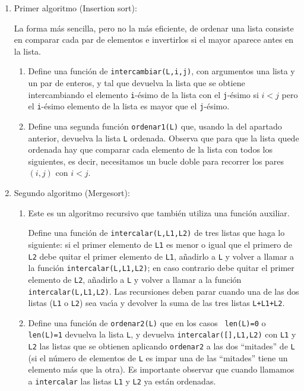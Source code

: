 \begin{enumerate}
\item {\sc Primer algoritmo (Insertion sort):}

\medskip

La forma m\'as sencilla, pero no la m\'as eficiente,  de ordenar una lista consiste en comparar cada par de elementos e invertirlos si el mayor aparece antes en la lista. 

\begin{ejer}
\begin{enumerate}
\item Define una funci\'on de {\sage} {\tt intercambiar(L,i,j)}, con argumentos
una
lista y un par de enteros, y tal que devuelva la lista que se obtiene
intercambiando el elemento {\tt i}-\'esimo de la lista con el
{\tt j}-\'esimo si $i<j$ pero el {\tt i}-\'esimo elemento de la lista es mayor que el
{\tt j}-\'esimo. %
\item Define una segunda funci\'on {\tt ordenar1(L)} que, usando
la del apartado anterior, devuelva la lista {\tt L} ordenada. Observa que para
que la lista quede ordenada hay que comparar cada elemento de la lista con {\sc
todos} los siguientes, es decir, necesitamos un bucle doble para recorrer los pares $(i,j)$ con $i<j$.
\end{enumerate}
\end{ejer}
\item \label{mergesort}{\sc Segundo algoritmo (Mergesort):}

\begin{ejer}
\begin{enumerate}
\item Este es un algoritmo recursivo que tambi\'en utiliza una funci\'on
auxiliar. 

Define una funci\'on de {\sage} {\tt intercalar(L,L1,L2)} de tres listas
que haga lo siguiente: si el primer elemento de {\tt L1} es menor o igual que el
primero de {\tt L2} debe quitar el primer elemento de {\tt L1}, a\~nadirlo a
{\tt L} y
volver a llamar a la funci\'on {\tt intercalar(L,L1,L2)};  en caso
contrario debe quitar el primer elemento de {\tt L2}, a\~nadirlo a {\tt L} y
volver a
llamar a la funci\'on {\tt intercalar(L,L1,L2)}. Las recursiones deben parar
cuando una de las dos listas ({\tt L1} o {\tt L2}) sea vac\'{\i}a y devolver la
suma
de las tres listas {\tt L+L1+L2}.
\item Define una funci\'on de {\sage} {\tt ordenar2(L)} que en los casos {\tt
len(L)=0} o {\tt len(L)=1} devuelva la lista {\tt L}, 
y devuelva {\tt intercalar([],L1,L2)} con {\tt L1} y {\tt L2} las
listas que se obtienen aplicando {\tt ordenar2} a las dos ``mitades'' de {\tt L}
 (si
el n\'umero de elementos de {\tt L} es impar una de las ``mitades'' tiene un
elemento m\'as que la otra). Es importante observar que cuando llamamos a
{\tt intercalar} las listas {\tt L1} y {\tt L2} ya est\'an ordenadas.


\end{enumerate}
\end{ejer}
\end{enumerate}
